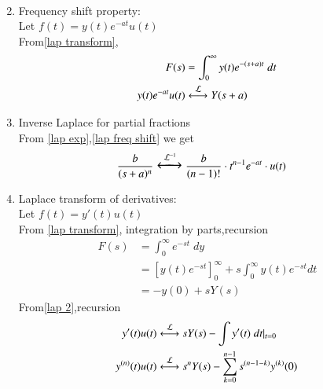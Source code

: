 \begin{enumerate}[label=\thechapter.\arabic*,ref=\thechapter.\theenumi]
\begin{align}
\end{align}
\item Frequency shift property:\\
        Let $f(t)=y(t)e^{-at}u(t)$\\
From\eqref{lap transform},
\begin{align}
        F(s)&=\int_0^{\infty}y(t)e^{-(s+a)t}\;dt\\
         y(t)e^{-at}u(t)&\system{L}Y(s+a)\label{lap freq shift}
\end{align}
\item Inverse Laplace for partial fractions\\
From \eqref{lap exp},\eqref{lap freq shift} we get
\begin{align}
    &\frac{b}{(s+a)^n}\Large\xleftrightarrow{\mathcal{L}^{-1}}\frac{b}{(n-1)!}\cdot t^{n-1} e^{-at}\cdot u(t)\label{inv lap (partial fractions)}
\end{align}
\item Laplace transform of derivatives:\\
        Let $f(t)=y'(t)u(t)$\\
From \eqref{lap transform}, integration by parts,recursion
\begin{align}
        F(s)&=\int_{0}^\infty e^{-st}\; dy\\
        &=[y(t)e^{-st}]_0^\infty+s\int_0^\infty y(t)e^{-st}dt\\
        &=-y(0)+sY(s)\label{lap 2}
\end{align}
From\eqref{lap 2},recursion
\begin{align}
        y'(t)u(t)&\system{L}sY(s)-\int y'(t)\;dt\vert_{t=0}\\
        y^{(n)}(t)u(t)&\system{L}s^nY(s)-\sum\limits_{k=0}^{n-1}s^{(n-1-k)}y^{(k)}(0)\label{lap (derivatives)}
\end{align}
\end{enumerate}
